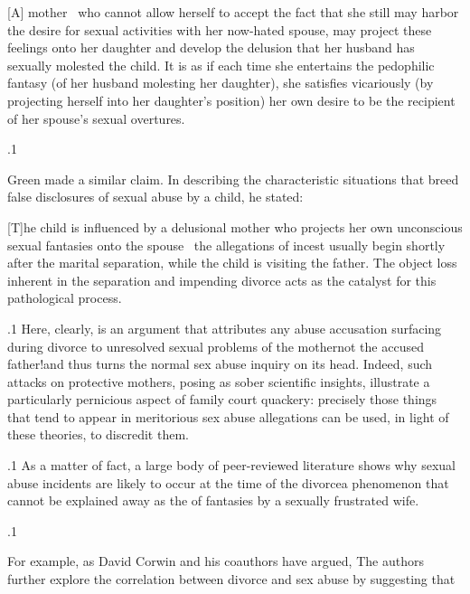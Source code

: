 \documentclass[11pt, twoside]{article}
\begin{document}
{{\begin{blockQuote}
{[A]} mother \ellThree{2pt}{2pt}\ who cannot allow herself to accept the fact that she
still may harbor the desire for sexual activities with her now-hated
spouse, may project these feelings onto her daughter and develop
the delusion that her husband has sexually molested the child.
It is as if each time she entertains the pedophilic fantasy (of her
husband molesting her daughter), she satisfies vicariously (by projecting herself into her daughter’s position) her own desire to be
the recipient of her spouse’s sexual overtures.
\end{blockQuote}

}%

\p.1{%
Green made a similar claim. In describing the characteristic situations
that breed false disclosures of sexual abuse by a child, he stated:

\begin{blockQuote}
{[T]}he child is influenced by a delusional mother who projects her
own unconscious sexual fantasies onto the spouse \ellThree{2pt}{2pt}\ the allegations of incest usually begin shortly after the marital separation,
while the child is visiting the father. The object loss inherent in
the separation and impending divorce acts as the catalyst for this
pathological process.
\end{blockQuote}

}%

\p.1{%
Here, clearly, is an argument that attributes any abuse accusation surfacing during divorce to unresolved sexual problems of the mother\mdash{}not
the accused father!\mdash{}and thus turns the normal sex abuse inquiry on
its head. Indeed, such attacks on protective mothers, posing as sober
scientific insights, illustrate a particularly pernicious aspect of family
court quackery: precisely those things that tend to appear in meritorious
sex abuse allegations can be used, in light of these theories, to discredit
them.
}%

\p.1{%
As a matter of fact, a large body of peer-reviewed literature shows why
sexual abuse incidents are likely to occur at the time of the
divorce\mdash{}a phenomenon that cannot be explained away as the  of
fantasies by a sexually frustrated wife.
}%

\p.1{%
For example, as David Corwin and his coauthors have argued, 
The authors further explore the correlation between divorce and sex
abuse by suggesting that

}}
\end{document}
